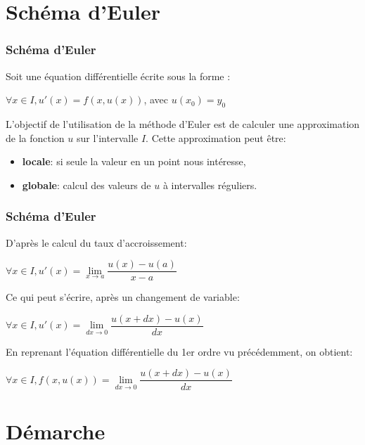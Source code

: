 

\section{Schéma d'Euler} 

\begin{frame}[fragile]
\frametitle{Schéma d'Euler}

Soit une équation différentielle écrite sous la forme :
\begin{center}
$\forall x \in I, u'(x)=f(x,u(x))$, avec $u(x_0) = y_0$
\end{center}

\begin{obj}
L'objectif de l'utilisation de la méthode d'Euler est de calculer une approximation de la fonction $u$ sur l'intervalle $I$. Cette approximation peut être:
\begin{itemize}
 \item \textbf{locale}: si seule la valeur en un point nous intéresse,
 \item \textbf{globale}: calcul des valeurs de $u$ à intervalles réguliers.
\end{itemize}
\end{obj}

\end{frame}

\begin{frame}[fragile]
\frametitle{Schéma d'Euler}

D'après le calcul du taux d'accroissement:
\begin{center}
$\forall x \in I, u'(x)=\lim\limits_{x\rightarrow a} \dfrac{u(x)-u(a)}{x-a}$
\end{center}

Ce qui peut s'écrire, après un changement de variable:
\begin{center}
$\forall x \in I, u'(x)=\lim\limits_{dx\rightarrow 0} \dfrac{u(x+dx)-u(x)}{dx}$
\end{center}

En reprenant l'équation différentielle du 1er ordre vu précédemment, on obtient:
\begin{center}
$\forall x \in I, f(x,u(x))=\lim\limits_{dx\rightarrow 0} \dfrac{u(x+dx)-u(x)}{dx}$
\end{center}
\end{frame}

\section{Démarche} 

